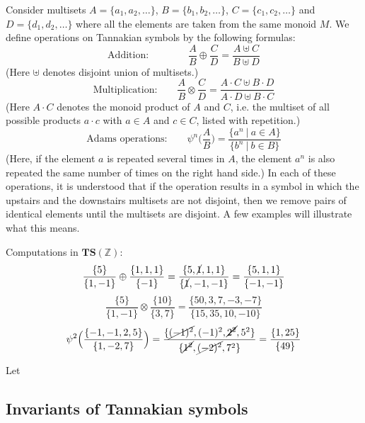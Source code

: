 \documentclass[a4paper]{article}
\begin{document}
Consider multisets $A = \{a_1, a_2, \ldots\}$, $B = \{b_1, b_2, \ldots\}$, $C = \{c_1, c_2, \ldots\}$ and $D = \{ d_1, d_2, \ldots \}$ where all the elements are taken from the same monoid $M$. We define operations on Tannakian symbols by the following formulas:
$$ \textrm{Addition:} \qquad \qquad \frac{A}{B} \oplus \frac{C}{D} = \frac{A \uplus C}{B \uplus D}  $$
(Here $\uplus$ denotes disjoint union of multisets.)
$$ \textrm{Multiplication:} \qquad \frac{A}{B} \otimes \frac{C}{D} = \frac{ A \cdot C \uplus B \cdot D }{ A \cdot D \uplus B \cdot C }  $$
(Here $A \cdot C$ denotes the monoid product of $A$ and $C$, i.e. the multiset of all possible products $a \cdot c$ with $a \in A$ and $c \in C$, listed with repetition.)
$$  \textrm{Adams operations:} \qquad \psi^n \Big( \frac{A}{B} \Big) = \frac{\{a^n \ \vert \ a \in A \}}{\{b^n \ \vert \ b \in B \}}    $$ 
(Here, if the element $a$ is repeated several times in $A$, the element $a^n$ is also repeated the same number of times on the right hand side.)
In each of these operations, it is understood that if the operation results in a symbol in which the upstairs and the downstairs multisets are not disjoint, then we remove pairs of identical elements until the multisets are disjoint. A few examples will illustrate what this means.
\begin{example} Computations in $\mathbf{TS}(\mathbb{Z})$:
$$\frac{ \{ 5\} }{ \{ 1, -1 \} } \oplus \frac{  \{ 1, 1, 1 \}  }{  \{ -1 \}  } = \frac{  \{ 5, \cancel{1}, 1, 1 \}   }{  \{ \cancel{1}, -1, -1 \} } = \frac{  \{ 5, 1, 1 \}   }{  \{  -1, -1 \} } $$
$$\frac{ \{ 5\} }{ \{ 1, -1 \} } \otimes \frac{ \{ 10 \} }{  \{ 3, 7 \}  } = \frac{  \{ 50, 3, 7, -3, -7 \}   }{  \{ 15, 35, 10, -10 \} }  $$
$$ \psi^2 \Big( \frac{ \{  -1, -1, 2, 5 \} }{ \{  1, -2, 7\} } \Big) =  \frac{ \{  \cancel{(-1)^2}, (-1)^2, \cancel{2^2}, 5^2 \} }{ \{  \cancel{1^2}, \cancel{(-2)^2}, 7^2 \} } = \frac{ \{  1, 25 \} }{ \{  49 \} } $$
\end{example}


\begin{theorem}
Let 
\end{theorem}



\subsection{Invariants of Tannakian symbols}
\end{document}
